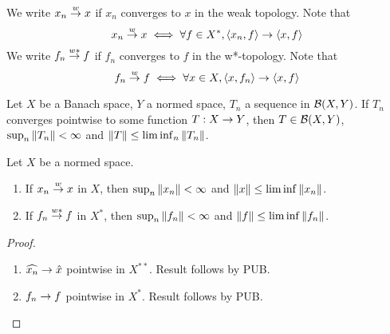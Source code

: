 \documentclass{article}
\begin{document}
\begin{notation}
  We write $x_n \overset w{\rightarrow} x$ if $x_n$ converges to $x$ in the weak topology. Note that
  $$x_n \overset w{\rightarrow} x \iff \forall f \in X^*, \left\langle x_n, f\right\rangle \rightarrow \left\langle x, f\right\rangle$$
  We write $f_n \overset{w*}{\rightarrow} f$ if $f_n$ converges to $f$ in the w*-topology. Note that
  $$f_n \overset w{\rightarrow} f \iff \forall x \in X, \left\langle x, f_n\right\rangle \rightarrow \left\langle x, f\right\rangle$$
\end{notation}

\begin{thm}
  Let $X$ be a Banach space, $Y$ a normed space, $T_n$ a sequence in $\mathcal B(X, Y)$. If $T_n$ converges pointwise to some function $T : X \rightarrow Y$, then $T \in \mathcal B(X, Y)$, $\sup_n \left\lVert T_n\right\rVert < \infty$ and $\left\lVert T\right\rVert \le \liminf_n \left\lVert T_n\right\rVert$.
\end{thm}

\begin{nprop}
  Let $X$ be a normed space.
  \begin{enumerate}
    \item If $x_n \overset w{\rightarrow} x$ in $X$, then $\sup_n \left\lVert x_n\right\rVert < \infty$ and $\left\lVert x\right\rVert \le \liminf \left\lVert x_n\right\rVert$.
    \item If $f_n \overset{w*}{\rightarrow} f$ in $X^*$, then $\sup_n \left\lVert f_n\right\rVert < \infty$ and $\left\lVert f\right\rVert \le \liminf \left\lVert f_n\right\rVert$.
  \end{enumerate}
\end{nprop}
\begin{proof}~
  \begin{enumerate}
    \item $\widehat{x_n} \rightarrow \hat x$ pointwise in $X^{**}$. Result follows by PUB.
    \item $f_n \rightarrow f$ pointwise in $X^*$. Result follows by PUB.
  \end{enumerate}
\end{proof}

\newlec

\printindex
\end{document}
